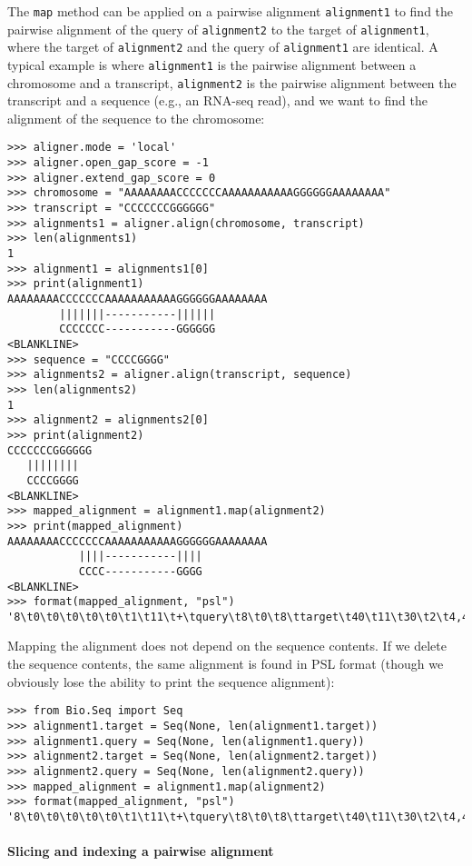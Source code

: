 The \verb+map+ method can be applied on a pairwise alignment \verb+alignment1+ to find the pairwise alignment of the query of \verb+alignment2+ to the target of \verb+alignment1+, where the target of \verb+alignment2+ and the query of \verb+alignment1+ are identical. A typical example is where \verb+alignment1+ is the pairwise alignment between a chromosome and a transcript, \verb+alignment2+ is the pairwise alignment between the transcript and a sequence (e.g., an RNA-seq read), and we want to find the alignment of the sequence to the chromosome:
        
\begin{verbatim}
>>> aligner.mode = 'local'
>>> aligner.open_gap_score = -1
>>> aligner.extend_gap_score = 0
>>> chromosome = "AAAAAAAACCCCCCCAAAAAAAAAAAGGGGGGAAAAAAAA"
>>> transcript = "CCCCCCCGGGGGG"
>>> alignments1 = aligner.align(chromosome, transcript)
>>> len(alignments1)
1
>>> alignment1 = alignments1[0]
>>> print(alignment1)
AAAAAAAACCCCCCCAAAAAAAAAAAGGGGGGAAAAAAAA
        |||||||-----------||||||
        CCCCCCC-----------GGGGGG
<BLANKLINE>
>>> sequence = "CCCCGGGG"
>>> alignments2 = aligner.align(transcript, sequence)
>>> len(alignments2)
1
>>> alignment2 = alignments2[0]
>>> print(alignment2)
CCCCCCCGGGGGG
   ||||||||
   CCCCGGGG
<BLANKLINE>
>>> mapped_alignment = alignment1.map(alignment2)
>>> print(mapped_alignment)
AAAAAAAACCCCCCCAAAAAAAAAAAGGGGGGAAAAAAAA
           ||||-----------||||
           CCCC-----------GGGG
<BLANKLINE>
>>> format(mapped_alignment, "psl")
'8\t0\t0\t0\t0\t0\t1\t11\t+\tquery\t8\t0\t8\ttarget\t40\t11\t30\t2\t4,4,\t0,4,\t11,26,\n'
\end{verbatim}

Mapping the alignment does not depend on the sequence contents. If we delete
the sequence contents, the same alignment is found in PSL format (though we
obviously lose the ability to print the sequence alignment):

\begin{verbatim}
>>> from Bio.Seq import Seq
>>> alignment1.target = Seq(None, len(alignment1.target))
>>> alignment1.query = Seq(None, len(alignment1.query))
>>> alignment2.target = Seq(None, len(alignment2.target))
>>> alignment2.query = Seq(None, len(alignment2.query))
>>> mapped_alignment = alignment1.map(alignment2)
>>> format(mapped_alignment, "psl")
'8\t0\t0\t0\t0\t0\t1\t11\t+\tquery\t8\t0\t8\ttarget\t40\t11\t30\t2\t4,4,\t0,4,\t11,26,\n'
\end{verbatim}

\paragraph*{Slicing and indexing a pairwise alignment}

